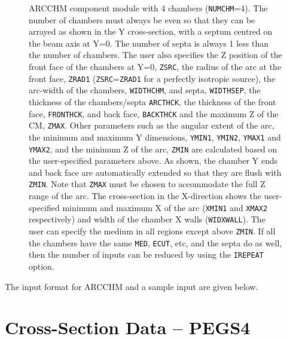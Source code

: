 \documentclass[12pt,twoside]{article}
\begin{document}
\begin{figure}[htbp]
\begin{htmlonly}
\end{htmlonly}
\caption[ARCCHM CM geometry.]
{ARCCHM component module with 4 chambers ({\tt NUMCHM}=4).  The number of
chambers must always be even so that they can be arrayed as shown in
the Y cross-section, with a
septum centred on the beam axis at Y=0.  The number of septa is always 1 less
than the number of chambers.  The user also specifies the Z position of the
front face of the chambers at Y=0, {\tt ZSRC}, the radius of the arc at the
front face, {\tt ZRAD1} ({\tt ZSRC}={\tt ZRAD1} for a perfectly isotropic
source), the arc-width of the chambers, {\tt WIDTHCHM}, and
septa, {\tt WIDTHSEP}, the thickness of the chambers/septa {\tt ARCTHCK},
the thickness of the front face, {\tt FRONTHCK}, and back face, {\tt BACKTHCK}
and the maximum Z of the CM, {\tt ZMAX}.  Other parameters such as the
angular extent of the arc, the minimum and maximum Y dimensions, {\tt YMIN1},
{\tt YMIN2}, {\tt YMAX1} and {\tt YMAX2}, and the minimum Z of the arc,
{\tt ZMIN} are calculated based on the user-specified parameters above.  As shown,
the chamber Y ends and back face are automatically extended so that they
are flush with {\tt ZMIN}.  Note that {\tt ZMAX} must be chosen
to accommodate the full Z range of the arc.  The cross-section in the X-direction
shows the user-specified minimum and maximum X of the arc ({\tt XMIN1} and
{\tt XMAX2} respectively) and width of the chamber X walls ({\tt WIDXWALL}).
The user can specify the medium in all regions except above {\tt ZMIN}.  If
all the chambers have the same {\tt MED}, {\tt ECUT}, etc, and the septa do
as well, then the number of inputs can be reduced by using the {\tt IREPEAT}
option.}
\label{fig_ARCCHMD}
\end{figure}
\clearpage

The input format for ARCCHM and a sample input are given below.

\begin{small}

\end{small}



\renewcommand{\rightmark}{Cross-section data-PEGS4}
\section{Cross-Section Data -- PEGS4}
\label{CSDP}
\end{document}
